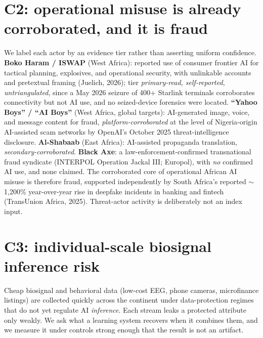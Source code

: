 \documentclass{article}
\begin{document}
\section{C2: operational misuse is already corroborated, and it is fraud}
\label{sec:threat}
We label each actor by an evidence tier rather than asserting uniform confidence. \textbf{Boko Haram / ISWAP}
(West Africa): reported use of consumer frontier AI for tactical planning, explosives, and operational security,
with unlinkable accounts and pretextual framing (Juelich, 2026); tier \emph{primary-read, self-reported,
untriangulated}, since a May 2026 seizure of 400+ Starlink terminals corroborates connectivity but not AI use,
and no seized-device forensics were located. \textbf{``Yahoo Boys'' / ``AI Boys''} (West Africa, global targets):
AI-generated image, voice, and message content for fraud, \emph{platform-corroborated} at the level of
Nigeria-origin AI-assisted scam networks by OpenAI's October 2025 threat-intelligence disclosure. \textbf{Al-Shabaab}
(East Africa): AI-assisted propaganda translation, \emph{secondary-corroborated}. \textbf{Black Axe}: a
law-enforcement-confirmed transnational fraud syndicate (INTERPOL Operation Jackal III; Europol), with \emph{no}
confirmed AI use, and none claimed. The corroborated core of operational African AI misuse is therefore fraud,
supported independently by South Africa's reported $\sim$1{,}200\% year-over-year rise in deepfake incidents in
banking and fintech (TransUnion Africa, 2025). Threat-actor activity is deliberately not an index input.

\section{C3: individual-scale biosignal inference risk}
\label{sec:biosignal}
Cheap biosignal and behavioral data (low-cost EEG, phone cameras, microfinance listings) are collected quickly
across the continent under data-protection regimes that do not yet regulate AI \emph{inference}. Each stream
leaks a protected attribute only weakly. We ask what a learning system recovers when it combines them, and we
measure it under controls strong enough that the result is not an artifact.
\end{document}
